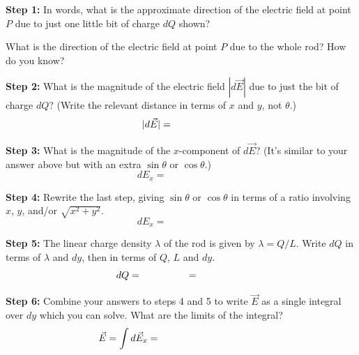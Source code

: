 
\par
\vspace{0.5cm}
\par
\textbf{Step 1:} \newline
In words, what is the approximate direction of the electric field at point $P$ due to just one little bit of charge $dQ$ shown?

\vspace{.6in}

What is the direction of the electric field at point $P$ due to the whole rod?  How do you know?

\vspace{.6in}

\textbf{Step 2:} \newline
What is the magnitude of the electric field $|d\vec{E}|$  due to just the bit of charge $dQ$?  (Write the relevant distance in terms of $x$ and $y$, not $\theta$.)
\[
|d\vec{E}|=\hspace{0.7in}
\]
\vspace{.3in}

\textbf{Step 3:} \newline
What is the magnitude of the $x$-component of   $d\vec{E}$?  (It's similar to your answer above but with an extra $\sin \theta$ or $\cos \theta$.) 
\[
d{E}_x=\hspace{1in}
\]
\vspace{.3in}

\pagebreak
\textbf{Step 4:} \newline
Rewrite the last step, giving  $\sin \theta$ or $\cos \theta$ in terms of a ratio involving $x$, $y$, and/or $\sqrt{x^2 + y^2}$.
\[
d{E}_x=\hspace{1in}
\]
\vspace{.3in}

\textbf{Step 5:} \newline
The linear charge density $\lambda$ of the rod is given by $\lambda = Q/L$.  Write $dQ$ in terms of $\lambda$  and $dy$, then in terms of $Q$, $L$ and $dy$.
\[
dQ=\hspace{0.7in}=\hspace{0.7in}
\]
\vspace{.3in}

\textbf{Step 6:} \newline
Combine your answers to steps 4 and 5 to write $\vec{E}$ as a single integral over $dy$ which you can solve.  What are the limits of the integral?
\[
\vec{E}=\int d\vec{E}_x=\hspace{1.5in}
\]
\vspace{.3in}

